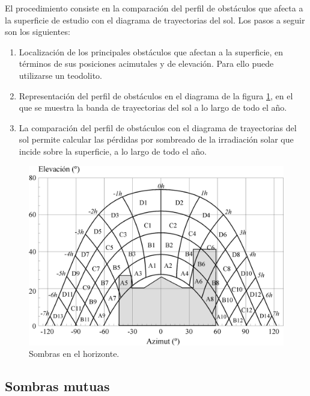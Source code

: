 El procedimiento consiste en la comparación del perfil de obstáculos
que afecta a la superficie de estudio con el diagrama de trayectorias
del sol. Los pasos a seguir son los siguientes:
\begin{enumerate}
\item Localización de los principales obstáculos que afectan a la
  superficie, en términos de sus posiciones acimutales y de
  elevación. Para ello puede utilizarse un teodolito.
\item Representación del perfil de obstáculos en el diagrama de la
  figura \ref{fig:DiagramaSombraLejana}, en el que se muestra la banda
  de trayectorias del sol a lo largo de todo el año.
\item La comparación del perfil de obstáculos con el diagrama de
  trayectorias del sol permite calcular las pérdidas por sombreado de
  la irradiación solar que incide sobre la superficie, a lo largo de
  todo el año. 
\end{enumerate}

\begin{figure}
\begin{centering}
\includegraphics[clip,scale=0.15]{../figs/SombraIES}
\end{centering}

\caption{Sombras en el horizonte.\label{fig:DiagramaSombraLejana}}

\end{figure}



\subsection{Sombras mutuas\label{sub:Sombras-mutuas}}

